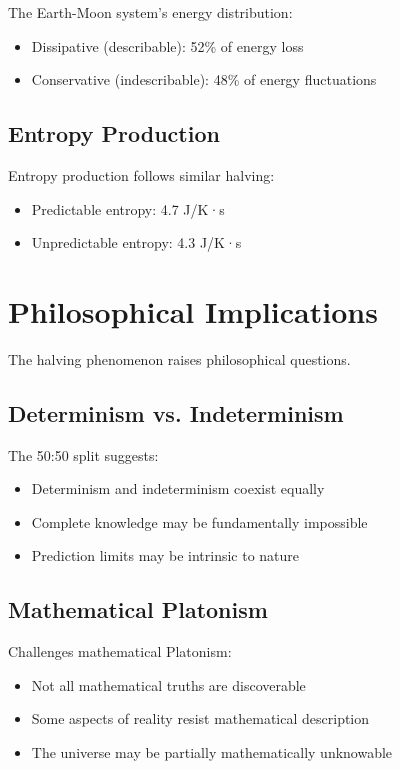 \documentclass[12pt,a4paper]{report}
\begin{document}
The Earth-Moon system's energy distribution:
\begin{itemize}
\item Dissipative (describable): 52\% of energy loss
\item Conservative (indescribable): 48\% of energy fluctuations
\end{itemize}

\subsection{Entropy Production}

Entropy production follows similar halving:
\begin{itemize}
\item Predictable entropy: 4.7 J/K·s
\item Unpredictable entropy: 4.3 J/K·s
\end{itemize}

\section{Philosophical Implications}

The halving phenomenon raises philosophical questions.

\subsection{Determinism vs. Indeterminism}

The 50:50 split suggests:
\begin{itemize}
\item Determinism and indeterminism coexist equally
\item Complete knowledge may be fundamentally impossible
\item Prediction limits may be intrinsic to nature
\end{itemize}

\subsection{Mathematical Platonism}

Challenges mathematical Platonism:
\begin{itemize}
\item Not all mathematical truths are discoverable
\item Some aspects of reality resist mathematical description
\item The universe may be partially mathematically unknowable
\end{itemize}
\end{document}
